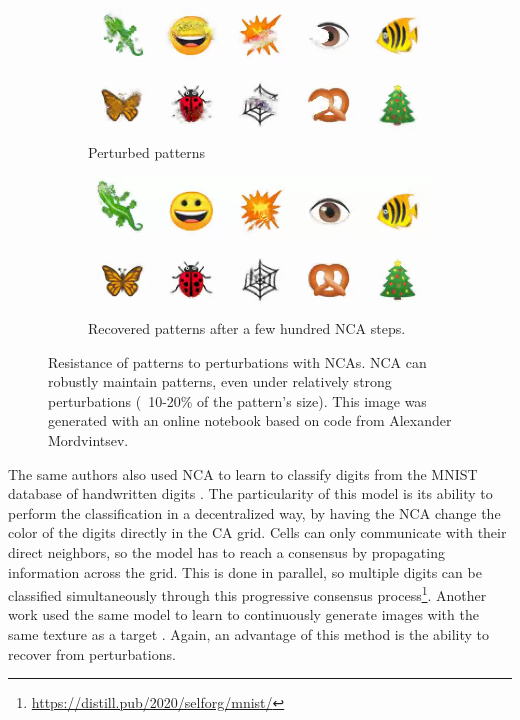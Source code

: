 \begin{figure}[htbp]
  \centering
  \begin{subfigure}[t]{.49\linewidth}
    \centering
    \includegraphics[width=\linewidth]{figures/nca_perturb.png}
    \caption{Perturbed patterns}
    \label{fig:nca_perturb}
  \end{subfigure}
  \begin{subfigure}[t]{.49\linewidth}
    \centering
    \includegraphics[width=\linewidth]{figures/nca_recover.png}
    \caption{Recovered patterns after a few hundred \ac{NCA} steps.}
    \label{fig:nca_recover}
  \end{subfigure}
  \caption[Resistance of patterns]{Resistance of patterns to perturbations with
    \acp{NCA}. \ac{NCA} can robustly maintain patterns, even under relatively
    strong perturbations (~10-20\% of the pattern's size). This image was
    generated with an online notebook based on code from Alexander
    Mordvintsev\footnotemark.}
  \label{fig:nca}
\end{figure}

The same authors also used \ac{NCA} to learn to classify digits from the MNIST
database of handwritten digits
\parencite{randazzoSelfclassifyingMNISTDigits2020}. The particularity of this
model is its ability to perform the classification in a decentralized way, by
having the \ac{NCA} change the color of the digits directly in the \ac{CA} grid.
Cells can only communicate with their direct neighbors, so the model has to
reach a consensus by propagating information across the grid. This is done in
parallel, so multiple digits can be classified simultaneously through this
progressive consensus
process\footnote{\url{https://distill.pub/2020/selforg/mnist/}}.
Another work used the same model to learn to continuously generate images with
the same texture as a target \parencite{niklassonSelfOrganisingTextures2021}.
Again, an advantage of this method is the ability to recover from perturbations.

